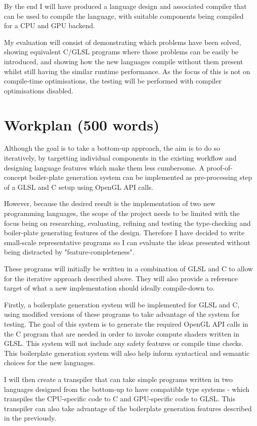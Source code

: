 \documentclass[11pt]{article}
\begin{document}
By the end I will have produced a language design and associated compiler that
can be used to compile the language, with suitable components being compiled
for a CPU and GPU backend.

My evaluation will consist of demonstrating which problems have been solved,
showing equivalent C/GLSL programs where those problems can be easily be
introduced, and showing how the new languages compile without them present
whilst still having the similar runtime performance. As the focus of this is
not on compile-time optimisations, the testing will be performed with compiler
optimisations disabled.

\section{Workplan (500 words)}

Although the goal is to take a bottom-up approach, the aim is to do so
iteratively, by targetting individual components in the existing workflow and
designing language features which make them less cumbersome. A proof-of-concept
boiler-plate generation system can be implemented as pre-processing step of a
GLSL and C setup using OpenGL API calls.

However, because the desired result is the implementation of two new
programming languages, the scope of the project needs to be limited with the
focus being on researching, evaluating, refining and testing the type-checking
and boiler-plate generating features of the design. Therefore I have decided to
write small-scale representative programs so I can evaluate the ideas
presented without being distracted by "feature-completeness".

These programs will initially be written in a combination of GLSL and C to
allow for the iterative approach described above. They will also provide a
reference target of what a new implementation should ideally compile-down to.

Firstly, a boilerplate generation system will be implemented for GLSL and C,
using modified versions of these programs to take advantage of the system for
testing. The goal of this system is to generate the required OpenGL API calls
in the C program that are needed in order to invoke compute shaders written in
GLSL. This system will not include any safety features or compile time checks.
This boilerplate generation system will also help inform syntactical and
semantic choices for the new languages.

I will then create a transpiler that can take simple programs written in two
languages designed from the bottom-up to have compatible type systems - which
transpiles the CPU-specific code to C and GPU-specific code to GLSL. This
transpiler can also take advantage of the boilerplate generation features
described in the previously.
\end{document}
